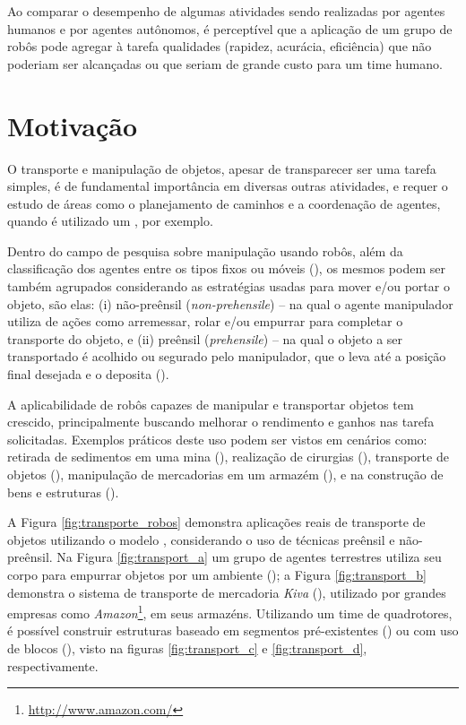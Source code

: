 Ao comparar o desempenho de algumas atividades sendo realizadas por agentes humanos e por agentes autônomos, é perceptível que a aplicação de um grupo de robôs pode agregar à tarefa qualidades (rapidez, acurácia, eficiência) que não poderiam ser alcançadas ou que seriam de grande custo para um time humano.

\section{Motivação} %
\label{sub:manipula_o_de_objetos}

O transporte e manipulação de objetos, apesar de transparecer ser uma tarefa simples, é de fundamental importância em diversas outras atividades, e requer o estudo de áreas como o planejamento de caminhos e a coordenação de agentes, quando é utilizado um , por exemplo.

Dentro do campo de pesquisa sobre manipulação usando robôs, além da classificação dos agentes entre os tipos fixos ou móveis (\cite{Rol2011}), os mesmos podem ser também agrupados considerando as estratégias usadas para mover e/ou portar o objeto, são elas: (i) não-preênsil (\emph{non-prehensile}) -- na qual o agente manipulador utiliza de ações como arremessar, rolar e/ou empurrar para completar o transporte do objeto, e (ii) preênsil (\emph{prehensile}) -- na qual o objeto a ser transportado é acolhido ou segurado pelo manipulador, que o leva até a posição final desejada e o deposita (\cite{Lynch1996,murray1994}).

A aplicabilidade de robôs capazes de manipular e transportar objetos tem crescido, principalmente buscando melhorar o rendimento e ganhos nas tarefa solicitadas.
Exemplos práticos deste uso podem ser vistos em cenários como: retirada de sedimentos em uma mina (\cite{Murphy2009}), realização de cirurgias (\cite{Lehman2008}), transporte de objetos (\cite{Michael2011}), manipulação de mercadorias em um armazém (\cite{Guizzo2008}), e na construção de bens e estruturas (\cite{Lindsey2012, BarrosdosSantos2013, BarrosdosSantos2014,Augugliaro2014}).

A Figura \ref{fig:transporte_robos} demonstra aplicações reais de transporte de objetos utilizando o modelo , considerando o uso de técnicas preênsil e não-preênsil.
Na Figura \ref{fig:transport_a} um grupo de agentes terrestres utiliza seu corpo para empurrar objetos por um ambiente (\cite{Fink2008}); a Figura \ref{fig:transport_b} demonstra o sistema de transporte de mercadoria \emph{Kiva} (\cite{Guizzo2008}), utilizado por grandes empresas como \emph{Amazon}\footnote{\url{http://www.amazon.com/}}, em seus armazéns. Utilizando um time de quadrotores, é possível construir estruturas baseado em segmentos pré-existentes (\cite{Lindsey2012}) ou com uso de blocos (\cite{Augugliaro2014}), visto na figuras \ref{fig:transport_c} e \ref{fig:transport_d}, respectivamente.

